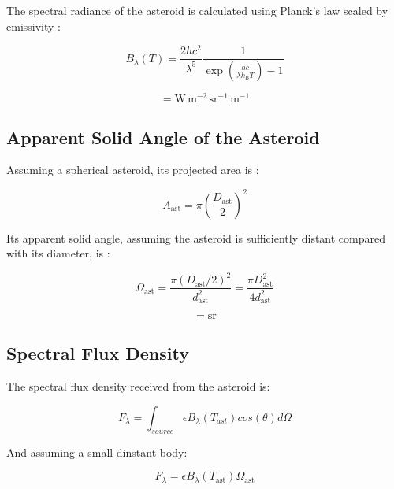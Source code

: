 \documentclass{article}
\begin{document}
The spectral radiance of the asteroid is calculated using Planck's law scaled by emissivity  \cite{planck_wikipedia}:

\begin{equation}
B_{\lambda}(T) =
\frac{2hc^2}{\lambda^5}
\frac{1}{
\exp\left(\frac{hc}{\lambda k_{\mathrm{B}}T}\right)-1
}
\end{equation}

\begin{equation}
[B_{\lambda}] =
\mathrm{W\,m^{-2}\,sr^{-1}\,m^{-1}}
\end{equation}

\subsection{Apparent Solid Angle of the Asteroid}

Assuming a spherical asteroid, its projected area is :

\begin{equation}
A_{\mathrm{ast}} =
\pi \left(\frac{D_{\mathrm{ast}}}{2}\right)^2
\end{equation}

Its apparent solid angle, assuming the asteroid is sufficiently distant compared with its diameter, is \cite{breinig_radiometry}:

\begin{equation}
\Omega_{\mathrm{ast}} =
\frac{\pi (D_{\mathrm{ast}}/2)^2}
{d_{\mathrm{ast}}^2}
=
\frac{\pi D_{\mathrm{ast}}^2}
{4d_{\mathrm{ast}}^2}
\end{equation}

\begin{equation}
[\Omega_{\mathrm{ast}}] = \mathrm{sr}
\end{equation}

\subsection{Spectral Flux Density}

The spectral flux density received from the asteroid is:

\begin{equation}
    F_{\lambda} = \int_{source} \epsilon B_{\lambda}(T_{ast})cos(\theta)d\Omega
\end{equation}

And assuming a small dinstant body:

\begin{equation}
F_{\lambda} =
\epsilon B_{\lambda}(T_{\mathrm{ast}})
\Omega_{\mathrm{ast}}
\end{equation}
\end{document}
